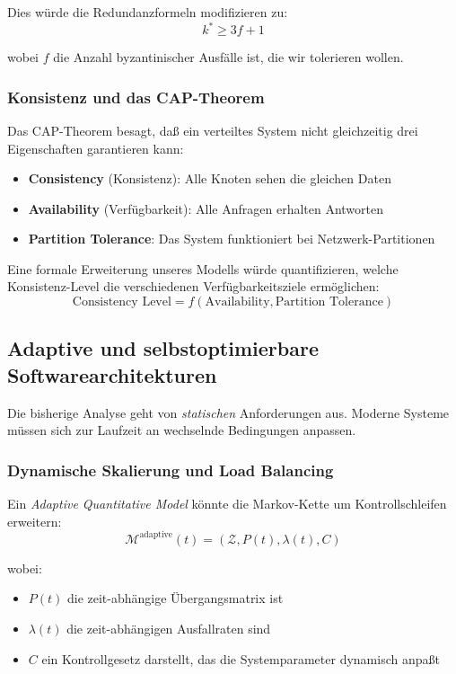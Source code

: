 \documentclass[a4paper,11pt]{article}
\theoremstyle{definition}
\begin{document}
Dies würde die Redundanzformeln modifizieren zu:
\[
    k^* \geq 3f + 1
\]

wobei $f$ die Anzahl byzantinischer Ausfälle ist, die wir tolerieren wollen.

\subsubsection{Konsistenz und das CAP-Theorem}

Das CAP-Theorem besagt, daß ein verteiltes System nicht gleichzeitig drei Eigenschaften 
garantieren kann:
\begin{itemize}
    \item \textbf{Consistency} (Konsistenz): Alle Knoten sehen die gleichen Daten
    \item \textbf{Availability} (Verfügbarkeit): Alle Anfragen erhalten Antworten
    \item \textbf{Partition Tolerance}: Das System funktioniert bei Netzwerk-Partitionen
\end{itemize}

Eine formale Erweiterung unseres Modells würde quantifizieren, welche Konsistenz-Level 
die verschiedenen Verfügbarkeitsziele ermöglichen:
\[
    \text{Consistency Level} = f(\text{Availability}, \text{Partition Tolerance})
\]

\subsection{Adaptive und selbstoptimierbare Softwarearchitekturen}

Die bisherige Analyse geht von \emph{statischen} Anforderungen aus. Moderne Systeme müssen sich 
zur Laufzeit an wechselnde Bedingungen anpassen.

\subsubsection{Dynamische Skalierung und Load Balancing}

Ein \emph{Adaptive Quantitative Model} könnte die Markov-Kette um Kontrollschleifen erweitern:
\[
    \mathcal{M}^{\text{adaptive}}(t) = (\mathcal{Z}, P(t), \lambda(t), C)
\]

wobei:
\begin{itemize}
    \item $P(t)$ die zeit-abhängige Übergangsmatrix ist
    \item $\lambda(t)$ die zeit-abhängigen Ausfallraten sind
    \item $C$ ein Kontrollgesetz darstellt, das die Systemparameter dynamisch anpaßt
\end{itemize}
\end{document}
